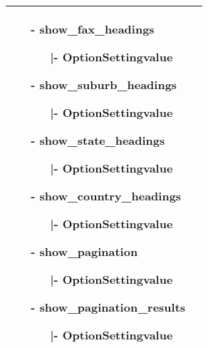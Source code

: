 \begin{minipage}{0.6\textwidth}
\begin{tabular}{|p{} | p{}|}
\begin{itemize}
		\item[-] show\_fax\_headings
			\begin{enumerate}
			   			\item[|-] OptionSettingvalue
			   		\end{enumerate} 
		\item[-] show\_suburb\_headings
			\begin{enumerate}
			   			\item[|-] OptionSettingvalue
			   		\end{enumerate} 
		\item[-] show\_state\_headings
			\begin{enumerate}
			   			\item[|-] OptionSettingvalue
			   		\end{enumerate} 
		\item[-] show\_country\_headings
			\begin{enumerate}
			   			\item[|-] OptionSettingvalue
			   		\end{enumerate} 
		\item[-] show\_pagination
			\begin{enumerate}
			   			\item[|-] OptionSettingvalue
			   		\end{enumerate} 
		\item[-] show\_pagination\_results
			\begin{enumerate}
			   			\item[|-] OptionSettingvalue
			   		\end{enumerate}
	\end{itemize}
\\
\hline
\end{tabular}
\end{minipage}


